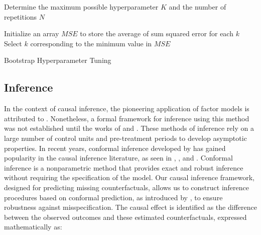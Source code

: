 \documentclass[12pt]{article}
\begin{document}
\begin{algorithm}[!ht]
    \SetAlgoLined
    Determine the maximum possible hyperparameter $K$ and the number of repetitions $N$\;

    Initialize an array $MSE$ to store the average of sum squared error for each $k$\;
    Select $k$ corresponding to the minimum value in $MSE$\;
    \caption{Bootstrap Hyperparameter Tuning}
    \label{algorithm: 1}
\end{algorithm}

\subsection{Inference}
\label{sec: inference}
In the context of causal inference, the pioneering application of factor models is attributed to \cite{hsiao2012panel}. Nonetheless, a formal framework for inference using this method was not established until the works of \cite{chan2016policy} and \cite{li2018inference}. These methods of inference rely on a large number of control units and pre-treatment periods to develop asymptotic properties. In recent years, conformal inference developed by \cite{chernozhukov2021exact} has gained popularity in the causal inference literature, as seen in \cite{ben2021augmented}, \cite{roth2023s}, and \cite{imbens2024causal}. Conformal inference is a nonparametric method that provides exact and robust inference without requiring the specification of the model. Our causal inference framework, designed for predicting missing counterfactuals, allows us to construct inference procedures based on conformal prediction, as introduced by \cite{shafer2008tutorial}, to ensure robustness against misspecification. The causal effect is identified as the difference between the observed outcomes and these estimated counterfactuals, expressed mathematically as:
\end{document}
